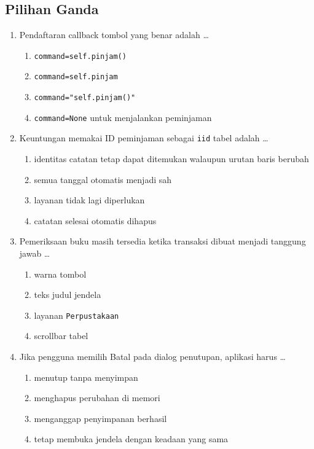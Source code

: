 \subsection{Pilihan Ganda}

\begin{enumerate}
  \item Pendaftaran callback tombol yang benar adalah \ldots
  \begin{enumerate}[label=\alph*.,itemsep=0pt]
    \item \texttt{command=self.pinjam()}
    \item \texttt{command=self.pinjam}
    \item \texttt{command="self.pinjam()"}
    \item \texttt{command=None} untuk menjalankan peminjaman
  \end{enumerate}
  \item Keuntungan memakai ID peminjaman sebagai \texttt{iid} tabel adalah \ldots
  \begin{enumerate}[label=\alph*.,itemsep=0pt]
    \item identitas catatan tetap dapat ditemukan walaupun urutan baris berubah
    \item semua tanggal otomatis menjadi sah
    \item layanan tidak lagi diperlukan
    \item catatan selesai otomatis dihapus
  \end{enumerate}
  \item Pemeriksaan buku masih tersedia ketika transaksi dibuat menjadi tanggung jawab \ldots
  \begin{enumerate}[label=\alph*.,itemsep=0pt]
    \item warna tombol
    \item teks judul jendela
    \item layanan \texttt{Perpustakaan}
    \item scrollbar tabel
  \end{enumerate}
  \item Jika pengguna memilih Batal pada dialog penutupan, aplikasi harus \ldots
  \begin{enumerate}[label=\alph*.,itemsep=0pt]
    \item menutup tanpa menyimpan
    \item menghapus perubahan di memori
    \item menganggap penyimpanan berhasil
    \item tetap membuka jendela dengan keadaan yang sama

\end{enumerate}
\end{enumerate}
